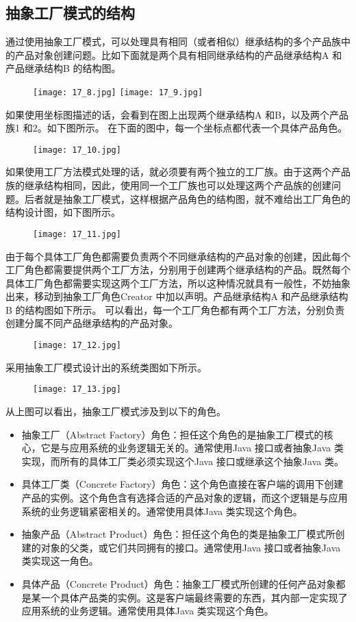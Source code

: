 \documentclass[../main.tex]{subfiles}
\begin{document}
\subsection{抽象工厂模式的结构}
通过使用抽象工厂模式，可以处理具有相同（或者相似）继承结构的多个产品族中的产品对象创建问题。比如下面就是两个具有相同继承结构的产品继承结构A 和产品继承结构B 的结构图。
\begin{figure}[H]
  \texttt{[image: 17\_8.jpg]}
  \texttt{[image: 17\_9.jpg]}
\end{figure}
%
如果使用坐标图描述的话，会看到在图上出现两个继承结构A 和B，以及两个产品族1 和2。如下图所示。
在下面的图中，每一个坐标点都代表一个具体产品角色。
\begin{figure}[H]
  \texttt{[image: 17\_10.jpg]}
\end{figure}
%
如果使用工厂方法模式处理的话，就必须要有两个独立的工厂族。由于这两个产品族的继承结构相同，因此，使用同一个工厂族也可以处理这两个产品族的创建问题。后者就是抽象工厂模式，这样根据产品角色的结构图，就不难给出工厂角色的结构设计图，如下图所示。
\begin{figure}[H]
  \texttt{[image: 17\_11.jpg]}
\end{figure}
%
由于每个具体工厂角色都需要负责两个不同继承结构的产品对象的创建，因此每个工厂角色都需要提供两个工厂方法，分别用于创建两个继承结构的产品。既然每个具体工厂角色都需要实现这两个工厂方法，所以这种情况就具有一般性，不妨抽象出来，移动到抽象工厂角色Creator 中加以声明。产品继承结构A 和产品继承结构B 的结构图如下所示。
可以看出，每一个工厂角色都有两个工厂方法，分别负责创建分属不同产品继承结构的产品对象。
\begin{figure}[H]
  \texttt{[image: 17\_12.jpg]}
\end{figure}
%
采用抽象工厂模式设计出的系统类图如下所示。
\begin{figure}[H]
  \texttt{[image: 17\_13.jpg]}
\end{figure}
%
从上图可以看出，抽象工厂模式涉及到以下的角色。
\begin{itemize}
  \item 抽象工厂（Abstract Factory）角色：担任这个角色的是抽象工厂模式的核心，它是与应用系统的业务逻辑无关的。通常使用Java 接口或者抽象Java 类实现，而所有的具体工厂类必须实现这个Java 接口或继承这个抽象Java 类。
  \item 具体工厂类（Concrete Factory）角色：这个角色直接在客户端的调用下创建产品的实例。这个角色含有选择合适的产品对象的逻辑，而这个逻辑是与应用系统的业务逻辑紧密相关的。通常使用具体Java 类实现这个角色。
  \item 抽象产品（Abstract Product）角色：担任这个角色的类是抽象工厂模式所创建的对象的父类，或它们共同拥有的接口。通常使用Java 接口或者抽象Java 类实现这一角色。
  \item 具体产品（Concrete Product）角色：抽象工厂模式所创建的任何产品对象都是某一个具体产品类的实例。这是客户端最终需要的东西，其内部一定实现了应用系统的业务逻辑。通常使用具体Java 类实现这个角色。
\end{itemize}
\end{document}
